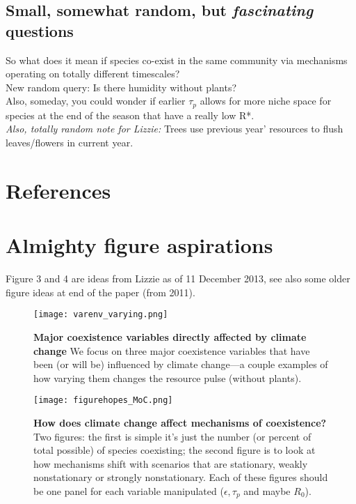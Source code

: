 \documentclass[11pt,a4paper,oneside]{article}
\begin{document}
\subsection{Small, somewhat random, but \emph{fascinating} questions} 
\noindent So what does it mean if species co-exist in the same community via mechanisms operating on totally different timescales?\\

\noindent  New random query: Is there humidity without plants?\\

\noindent  Also, someday, you could wonder if earlier \(\tau_{p}\) allows for more niche space for species at the end of the season that have a really low R*.\\

\noindent  \emph{Also, totally random note for Lizzie:} Trees use previous year' resources to flush leaves/flowers in current year.



\newpage
\section{References}



\newpage
\section{Almighty figure aspirations} 
\noindent Figure 3 and 4 are ideas from Lizzie as of 11 December 2013, see also some older figure ideas at end of the paper (from 2011). 

\begin{figure}[h!]
\centering
\noindent \texttt{[image: varenv\_varying.png]}
\caption{{\bf Major coexistence variables directly affected by
    climate change}  We focus on three major coexistence variables
  that have been (or will be) influenced by climate change---a couple
  examples of how varying them changes the resource pulse (without plants).}
\end{figure}

\newpage
\begin{figure}[h!]
\centering
\noindent \texttt{[image: figurehopes\_MoC.png]}
\caption{{\bf How does climate change affect mechanisms of coexistence?} Two figures: the first is simple it's just the number (or percent of total possible) of species coexisting; the second figure is to look at how mechanisms shift with scenarios that are stationary, weakly nonstationary or strongly nonstationary. Each of these figures should be one panel for each variable manipulated (\(\epsilon, \tau_{p}\) and maybe \(R_{0}\)).}
\end{figure}
\end{document}
